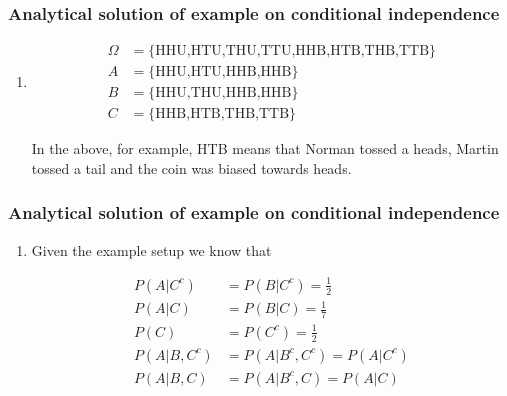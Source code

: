\begin{frame}
    \frametitle{Analytical solution of example on conditional independence}

    \scriptsize
    \begin{enumerate}[a]

        \item
            \begin{align*}
                \Omega&=\{\text{HHU,HTU,THU,TTU,HHB,HTB,THB,TTB}\}\\
                A&=\{\text{HHU,HTU,HHB,HHB}\}\\
                B&=\{\text{HHU,THU,HHB,HHB}\}\\
                C&=\{\text{HHB,HTB,THB,TTB}\}
            \end{align*}

            In the above, for example, HTB means that Norman tossed a heads,
            Martin tossed a tail and the coin was biased towards heads.

            \seti
    \end{enumerate}
\end{frame}

\begin{frame}
    \frametitle{Analytical solution of example on conditional independence}

    \scriptsize
    \begin{enumerate}[a]
        \conti
        \item

            Given the example setup we know that

            \begin{align*}
                P(A|C^c)&=P(B|C^c)=\frac{1}{2}\\
                P(A|C)&=P(B|C)=\frac{1}{7}\\
                P(C)&=P(C^c)=\frac{1}{2}\\
                P(A|B,C^c)&=P(A|B^c,C^c)=P(A|C^c)\\
                P(A|B,C)&=P(A|B^c,C)=P(A|C)
            \end{align*}
            
    \end{enumerate}
    \normalsize

\end{frame}

